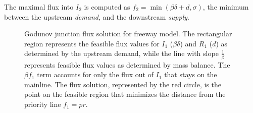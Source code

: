 The maximal flux into $I_2$ is computed as $f_2 = \min\left(\beta\delta + d, \sigma\right)$, the minimum between the upstream \emph{demand}, and the downstream \emph{supply}.

\begin{figure}
\hfill%
\hfill%

\caption{Godunov junction flux solution for freeway model. The rectangular region represents the feasible flux
values for $I_1$ ($\beta \delta$) and $R_1$ ($d$) as determined by the upstream demand, while
the line with slope $\frac{1}{\beta}$
represents feasible flux values as determined by mass balance. The
$\beta f_1$
term accounts for only the flux out of $I_1$
that stays on the mainline. The flux solution, represented by the
red circle, is the point on the feasible region that minimizes the
distance from the priority line $f_1 = p r$.}
\label{fig:Godunov-junction-flux}
\end{figure}

